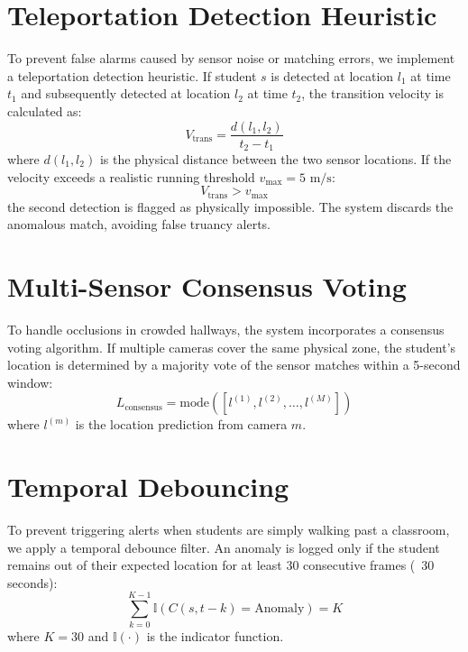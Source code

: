 \documentclass[12pt,a4paper,oneside]{report}
\begin{document}
\section{Teleportation Detection Heuristic}
To prevent false alarms caused by sensor noise or matching errors, we implement a teleportation detection heuristic. If student $s$ is detected at location $l_1$ at time $t_1$ and subsequently detected at location $l_2$ at time $t_2$, the transition velocity is calculated as:
\begin{equation}
    V_{\text{trans}} = \frac{d(l_1, l_2)}{t_2 - t_1}
\end{equation}
where $d(l_1, l_2)$ is the physical distance between the two sensor locations. If the velocity exceeds a realistic running threshold $v_{\text{max}} = 5\text{ m/s}$:
\begin{equation}
    V_{\text{trans}} > v_{\text{max}}
\end{equation}
the second detection is flagged as physically impossible. The system discards the anomalous match, avoiding false truancy alerts.

\section{Multi-Sensor Consensus Voting}
To handle occlusions in crowded hallways, the system incorporates a consensus voting algorithm. If multiple cameras cover the same physical zone, the student's location is determined by a majority vote of the sensor matches within a 5-second window:
\begin{equation}
    L_{\text{consensus}} = \text{mode}\left( [l^{(1)}, l^{(2)}, \dots, l^{(M)}] \right)
\end{equation}
where $l^{(m)}$ is the location prediction from camera $m$.

\section{Temporal Debouncing}
To prevent triggering alerts when students are simply walking past a classroom, we apply a temporal debounce filter. An anomaly is logged only if the student remains out of their expected location for at least 30 consecutive frames (~30 seconds):
\begin{equation}
    \sum_{k=0}^{K-1} \mathbb{I}\left( C(s, t - k) = \text{Anomaly} \right) = K
\end{equation}
where $K=30$ and $\mathbb{I}(\cdot)$ is the indicator function.
\end{document}
